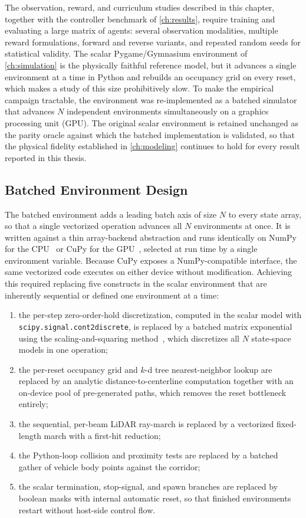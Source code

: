 The observation, reward, and curriculum studies described in this chapter, together with the controller benchmark of \cref{ch:results}, require training and evaluating a large matrix of agents: several observation modalities, multiple reward formulations, forward and reverse variants, and repeated random seeds for statistical validity. The scalar Pygame/Gymnasium environment of \cref{ch:simulation} is the physically faithful reference model, but it advances a single environment at a time in Python and rebuilds an occupancy grid on every reset, which makes a study of this size prohibitively slow. To make the empirical campaign tractable, the environment was re-implemented as a batched simulator that advances $N$ independent environments simultaneously on a graphics processing unit (GPU). The original scalar environment is retained unchanged as the parity oracle against which the batched implementation is validated, so that the physical fidelity established in \cref{ch:modeling} continues to hold for every result reported in this thesis.

\subsection{Batched Environment Design}

The batched environment adds a leading batch axis of size $N$ to every state array, so that a single vectorized operation advances all $N$ environments at once. It is written against a thin array-backend abstraction and runs identically on NumPy for the CPU~\cite{harris2020numpy} or CuPy for the GPU~\cite{okuta2017cupy}, selected at run time by a single environment variable. Because CuPy exposes a NumPy-compatible interface, the same vectorized code executes on either device without modification. Achieving this required replacing five constructs in the scalar environment that are inherently sequential or defined one environment at a time:

\begin{enumerate}
    \item the per-step zero-order-hold discretization, computed in the scalar model with \texttt{scipy.signal.cont2discrete}, is replaced by a batched matrix exponential using the scaling-and-squaring method~\cite{higham2005scaling}, which discretizes all $N$ state-space models in one operation;
    \item the per-reset occupancy grid and $k$-d tree nearest-neighbor lookup are replaced by an analytic distance-to-centerline computation together with an on-device pool of pre-generated paths, which removes the reset bottleneck entirely;
    \item the sequential, per-beam LiDAR ray-march is replaced by a vectorized fixed-length march with a first-hit reduction;
    \item the Python-loop collision and proximity tests are replaced by a batched gather of vehicle body points against the corridor;
    \item the scalar termination, stop-signal, and spawn branches are replaced by boolean masks with internal automatic reset, so that finished environments restart without host-side control flow.
\end{enumerate}

